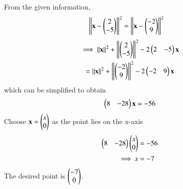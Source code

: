 From the given information,
\begin{align}
\norm{\vec{x}-\myvec{2\\-5}}^2 &= \norm{\vec{x}-\myvec{-2\\9}}^2 
\end{align}
\begin{multline}
\implies \norm{\vec{x}}^2+\norm{\myvec{2\\-5}}^2-2\myvec{2 & -5}\vec{x} 
\\
= \norm{\vec{x}}^2+\norm{\myvec{-2\\9}}^2-2\myvec{-2 & 9}\vec{x} 
\end{multline}
which can be simplified to obtain
\begin{align}
\myvec{8 & -28}\vec{x} = -56
\end{align}
Choose $\vec{x} = \myvec{x\\0}$ as the point lies on the x-axis
\begin{align}
\myvec{8 & -28}\myvec{x\\0} &= -56
\\
\implies x &= -7
\end{align}
The desired point is $\myvec{-7\\0}$.


